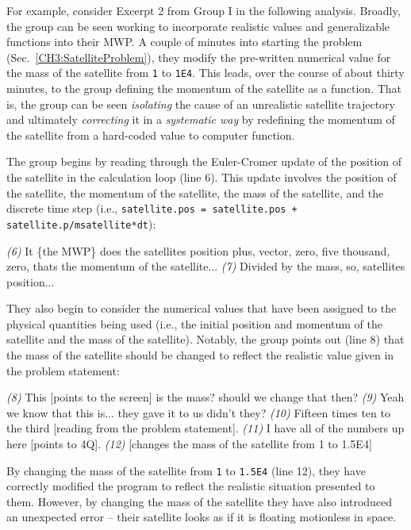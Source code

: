 \documentclass{msuphddissertation}
\begin{document}
\begin{doublespace}
For example, consider Excerpt 2 from Group I in the following analysis.  Broadly, the group can be seen working to incorporate realistic values and generalizable functions into their MWP.  A couple of minutes into starting the problem (Sec.~\ref{CH3:SatelliteProblem}), they modify the pre-written numerical value for the mass of the satellite from \texttt{1} to \texttt{1E4}.  This leads, over the course of about thirty minutes, to the group defining the momentum of the satellite as a function.  That is, the group can be seen \textit{isolating} the cause of an unrealistic satellite trajectory and ultimately \textit{correcting} it in a \textit{systematic way} by redefining the momentum of the satellite from a hard-coded value to computer function.

The group begins by reading through the Euler-Cromer update of the position of the satellite in the calculation loop (line 6).  This update involves the position of the satellite, the momentum of the satellite, the mass of the satellite, and the discrete time step (i.e., \texttt{satellite.pos = satellite.pos + satellite.p/msatellite*dt}):  \begin{description}
\SC \textit{(6)} It \{the MWP\} does the satellites position plus, vector, zero, five thousand, zero, thats the momentum of the satellite...
\SC \textit{(7)} Divided by the mass, so, satellites position...\end{description}  They also begin to consider the numerical values that have been assigned to the physical quantities being used (i.e., the initial position and momentum of the satellite and the mass of the satellite).  Notably, the group points out (line 8) that the mass of the satellite should be changed to reflect the realistic value given in the problem statement: \begin{description}
\SD \textit{(8)} This [points to the screen] is the mass? should we change that then?
\SC \textit{(9)} Yeah we know that this is... they gave it to us didn't they?
\SD \textit{(10)} Fifteen times ten to the third [reading from the problem statement].
\SA \textit{(11)} I have all of the numbers up here [points to 4Q].
\SC \textit{(12)} [changes the mass of the satellite from 1 to 1.5E4]
\end{description}  By changing the mass of the satellite from \texttt{1} to \texttt{1.5E4} (line 12), they have correctly modified the program to reflect the realistic situation presented to them.  However, by changing the mass of the satellite they have also introduced an unexpected error -- their satellite looks as if it is floating motionless in space.


\end{doublespace}
\end{document}
